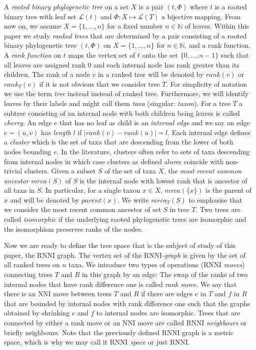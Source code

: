 \documentclass[11pt, a4paper]{article}
\newcommand{\nni}{\mathrm{NNI}}
\newcommand{\rnni}{\mathrm{RNNI}}
\begin{document}
A \emph{rooted binary phylogenetic tree} on a set $X$ is a pair $(t, \Phi)$ where $t$ is a rooted binary tree with leaf set $\mathcal{L}(t)$ and $\Phi:X \mapsto \mathcal{L}(T)$ a bijective mapping. 
From now on, we assume $X = \{1,\ldots,n\}$ for a fixed number $n \in \mathbb N$ of leaves.
Within this paper we study \emph{ranked trees} that are determined by a pair consisting of a rooted binary phylogenetic tree $(t, \Phi)$ on $X = \{1, \ldots, n\}$ for $n \in \mathbb N$, and a rank function.
A \emph{rank function} on $t$ maps the vertex set of $t$ onto the set $\{0,\ldots,n-1\}$ such that all leaves are assigned rank $0$ and each internal node has rank greater than its children.
The rank of a node $v$ in a ranked tree will be denoted by $rank(v)$ or $rank_T(v)$ if it is not obvious that we consider tree $T$.
For simplicity of notation we use the term \emph{tree} instead instead of ranked tree.
Furthermore, we will identify leaves by their labels and might call them \emph{taxa} (singular: \emph{taxon}).
For a tree $T$ a subtree consisting of an internal node with both children being leaves is called \emph{cherry}.
An edge $e$ that has no leaf as child is an \emph{internal edge} and we say an edge $e=(u,v)$ has \emph{length} $l$ if $|rank(v) - rank(u)| = l$.
Each internal edge defines a \emph{cluster} which is the set of taxa that are descending from the lower of both nodes bounding $e$. 
In the literature, clusters often refer to sets of taxa descending from internal nodes in which case clusters as defined above coincide with non-trivial clusters.
Given a subset $S$ of the set of taxa $X$, the \emph{most recent common ancestor} $mrca(S)$ of $S$ is the internal node with lowest rank that is ancestor of all taxa in $S$. 
In particular, for a single taxon $x \in X$, $mrca(\{x\})$ is the parent of $x$ and will be denoted by $parent(x)$.
We write $mrca_T(S)$ to emphasise that we consider the most recent common ancestor of set $S$ in tree $T$.
Two trees are called \emph{isomorphic} if the underlying rooted phylogenetic trees are isomorphic and the isomorphism preserves ranks of the nodes.


Now we are ready to define the tree space that is the subject of study of this paper, the $\rnni$ graph.
The vertex set of the \emph{$\rnni$-graph} is given by the set of all ranked trees on $n$ taxa.
We introduce two types of operations (\emph{$\rnni$ moves}) connecting trees $T$ and $R$ in this graph by an edge:
The swap of the ranks of two internal nodes that have rank difference one is called \emph{rank move}.
We say that there is an $\nni$ move between trees $T$ and $R$ if there are edges $e$ in $T$ and $f$ in $R$ that are bounded by internal nodes with rank difference one such that the graphs obtained by shrinking $e$ and $f$ to internal nodes are isomorphic.
Trees that are connected by either a rank move or an $\nni$ move are called \emph{$\rnni$ neighbours} or briefly neighbours.
Note that the previously defined $\rnni$ graph is a metric space, which is why we may call it \emph{$\rnni$ space} or just $\rnni$.
\end{document}
